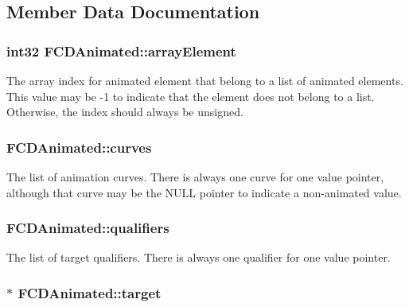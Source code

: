\subsection{Member Data Documentation}
\hypertarget{classFCDAnimated_a27daa356d592abe62b5f84871bb6fefc}{
\subsubsection[{arrayElement}]{\setlength{\rightskip}{0pt plus 5cm}int32 {\bf FCDAnimated::arrayElement}}}
\label{classFCDAnimated_a27daa356d592abe62b5f84871bb6fefc}
The array index for animated element that belong to a list of animated elements. This value may be -\/1 to indicate that the element does not belong to a list. Otherwise, the index should always be unsigned. \hypertarget{classFCDAnimated_a602e65dada6111b6b748555550c0cb18}{
\subsubsection[{curves}]{ {\bf FCDAnimated::curves}}}
\label{classFCDAnimated_a602e65dada6111b6b748555550c0cb18}
The list of animation curves. There is always one curve for one value pointer, although that curve may be the NULL pointer to indicate a non-\/animated value. \hypertarget{classFCDAnimated_a02ab9175d25055cd2d10d924de312490}{
\subsubsection[{qualifiers}]{ {\bf FCDAnimated::qualifiers}}}
\label{classFCDAnimated_a02ab9175d25055cd2d10d924de312490}
The list of target qualifiers. There is always one qualifier for one value pointer. \hypertarget{classFCDAnimated_aca46cbdc7ee7a1b4cf90a5aa6849f4e0}{
\subsubsection[{target}]{$\ast$ {\bf FCDAnimated::target}}}
